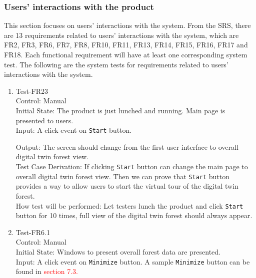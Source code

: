 \documentclass[12pt, titlepage]{article}
\begin{document}
\subsubsection{Users' interactions with the product}
This section focuses on users' interactions with the system. 
From the SRS, there are 13 requirements related to users' interactions
with the system, which
are FR2, FR3, FR6, FR7, FR8, FR10, FR11, FR13, FR14, FR15, FR16, FR17 and FR18.
Each functional requirement will have at least one 
corresponding system test. The following are the system tests for requirements
related to users' interactions with the system.

\begin{enumerate}
\item{Test-FR23\\}
Control: Manual\\ 

Initial State: The product is just lunched and running. Main page is
presented to users.\\

Input: A click event on \verb|Start| button.

Output: The screen should change from the first user interface to overall digital
twin forest view.\\

Test Case Derivation: If clicking \verb|Start| button can change the main page
to overall digital twin forest view. Then we can prove that \verb|Start| button
provides a way to allow users to start the virtual tour of the digital twin
forest.\\
					
How test will be performed:  Let testers lunch the product and click \verb|Start|
button for 10 times, full view of the digital twin forest should always appear.

\item{Test-FR6.1\\}
Control: Manual\\ 

Initial State: Windows to present overall forest data are presented.\\

Input: A click event on \verb|Minimize| button. A sample \verb|Minimize| button
can be found in \textcolor{red}{section 7.3.}\\


\end{enumerate}
\end{document}
